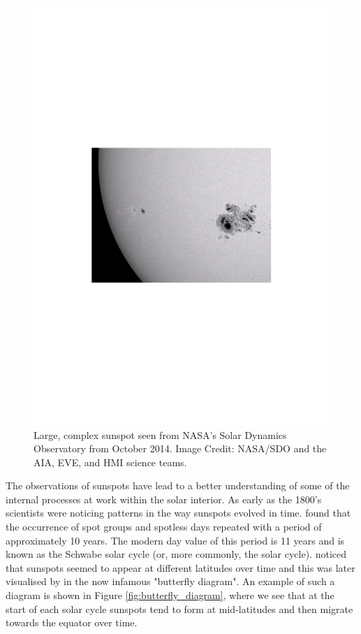 \begin{figure}
    \centering
    \includegraphics[scale=0.7]{Figures/1-Introduction/HMI_spot_Oct}
    \caption[Example of complex sunspot as seen by NASA's SDO]{Large, complex sunspot seen from NASA's Solar Dynamics Observatory from October 2014. Image Credit: NASA/SDO and the AIA, EVE, and HMI science teams.}
    \label{fig:sunspot_example}
\end{figure}

The observations of sunspots have lead to a better understanding of some of the internal processes at work within the solar interior. As early as the 1800's scientists were noticing patterns in the way sunspots evolved in time. \citet{Schwabe_1844} found that the occurrence of spot groups and spotless days repeated with a period of approximately 10 years. The modern day value of this period is 11 years and is known as the Schwabe solar cycle (or, more commonly, the solar cycle). \citet{Carrington_1858} noticed that sunspots seemed to appear at different latitudes over time and this was later visualised by \citet{Maunder_1904} in the now infamous "butterfly diagram". An example of such a diagram is shown in Figure \ref{fig:butterfly_diagram}, where we see that at the start of each solar cycle sunspots tend to form at mid-latitudes and then migrate towards the equator over time.

